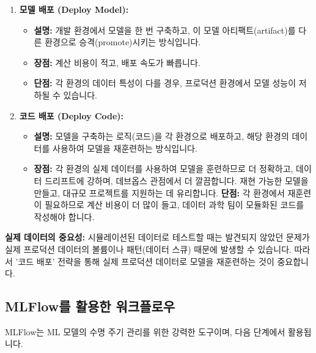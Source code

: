 \documentclass[11pt,a4paper]{article}
\theoremstyle{definition}
\begin{document}
\begin{enumerate}
    \item \textbf{모델 배포 (Deploy Model):}
    \begin{itemize}
        \item \textbf{설명:} 개발 환경에서 모델을 한 번 구축하고, 이 모델 아티팩트(artifact)를 다른 환경으로 승격(promote)시키는 방식입니다.
        \item \textbf{장점:} 계산 비용이 적고, 배포 속도가 빠릅니다.
        \item \textbf{단점:} 각 환경의 데이터 특성이 다를 경우, 프로덕션 환경에서 모델 성능이 저하될 수 있습니다.
    \end{itemize}

    \item \textbf{코드 배포 (Deploy Code):}
    \begin{itemize}
        \item \textbf{설명:} 모델을 구축하는 로직(코드)을 각 환경으로 배포하고, 해당 환경의 데이터를 사용하여 모델을 재훈련하는 방식입니다.
        \item \textbf{장점:} 각 환경의 실제 데이터를 사용하여 모델을 훈련하므로 더 정확하고, 데이터 드리프트에 강하며, 데브옵스 관점에서 더 깔끔합니다. 재현 가능한 모델을 만들고, 대규모 프로젝트를 지원하는 데 유리합니다.
        \textbf{단점:} 각 환경에서 재훈련이 필요하므로 계산 비용이 더 많이 들고, 데이터 과학 팀이 모듈화된 코드를 작성해야 합니다.
    \end{itemize}
\end{enumerate}

\begin{warningbox}
\textbf{실제 데이터의 중요성:}
시뮬레이션된 데이터로 테스트할 때는 발견되지 않았던 문제가 실제 프로덕션 데이터의 볼륨이나 패턴(데이터 스큐) 때문에 발생할 수 있습니다. 따라서 '코드 배포' 전략을 통해 실제 프로덕션 데이터로 모델을 재훈련하는 것이 중요합니다.
\end{warningbox}

\subsection{MLFlow를 활용한 워크플로우}

MLFlow는 ML 모델의 수명 주기 관리를 위한 강력한 도구이며, 다음 단계에서 활용됩니다.
\end{document}
